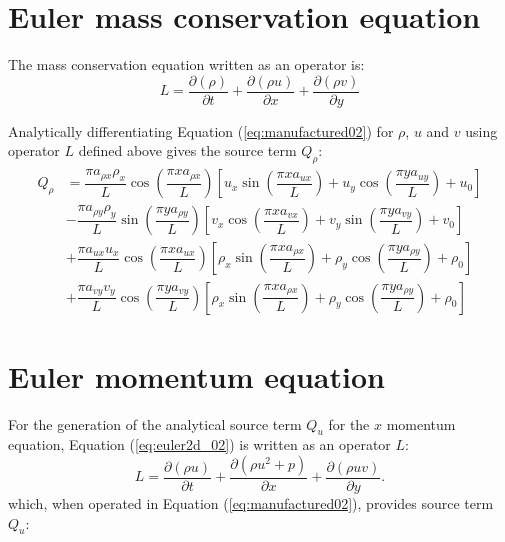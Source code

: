 \documentclass[10pt]{article}
\newcommand{\Diff}[2] {\dfrac{\partial( #1)}{\partial #2}}
\begin{document}
\section{Euler mass conservation equation}

The mass conservation equation written as an operator is:
\begin{equation}
 \label{eq:euler2d_11}
L= \Diff{\rho}{t} + \Diff{\rho u}{x}+\Diff{\rho v}{y} 
\end{equation}

Analytically differentiating Equation (\ref{eq:manufactured02}) for $\rho$, $u$ and $v$ using operator $L$ defined above gives  the source term $Q_{\rho}$:
\begin{equation}
\begin{split}
Q_{\rho} &= \dfrac{\pi a_{\rho   x} \rho _{x} }{L} \cos\left(\dfrac{\pi x a_{\rho   x}}{L}\right)\left[u_{x} \sin\left(\dfrac{\pi x a_{u  x}}{L}\right)+u_{y} \cos\left(\dfrac{\pi y a_{u  y}}{L}\right)+u_{0}\right] \\
%
&-\dfrac{\pi a_{\rho   y} \rho _{y} }{L}\sin\left(\dfrac{\pi y a_{\rho   y}}{L}\right)\left[v_{x} \cos\left(\dfrac{\pi x a_{v  x}}{L}\right)+v_{y} \sin\left(\dfrac{\pi y a_{v  y}}{L}\right)+v_{0}\right] \\
%
&+\dfrac{ \pi a_{u  x} u_{x} }{L}\cos\left(\dfrac{\pi x a_{u  x}}{L}\right)\left[\rho _{x} \sin\left(\dfrac{\pi x a_{\rho   x}}{L}\right)+\rho _{y} \cos\left(\dfrac{\pi y a_{\rho   y}}{L}\right)+\rho _{0}\right] \\
%
&+\dfrac{\pi a_{v  y} v_{y} }{L}\cos\left(\dfrac{\pi y a_{v  y}}{L}\right)\left[\rho _{x} \sin\left(\dfrac{\pi x a_{\rho   x}}{L}\right)+\rho _{y} \cos\left(\dfrac{\pi y a_{\rho   y}}{L} \right) + \rho _{0} \right]
\end{split}
\end{equation}

\section{Euler momentum equation}

For the generation of the analytical source term $Q_u$ for the $x$ momentum equation, Equation  (\ref{eq:euler2d_02}) is written as an  operator $L$:
\begin{equation}
 \label{eq:euler2d_12}
L=\Diff{\rho u}{t} + \Diff{\rho u^2 + p}{x}+\Diff{\rho uv}{y}.
\end{equation}
which, when operated in Equation (\ref{eq:manufactured02}), provides source term $Q_{u}$:
\end{document}
